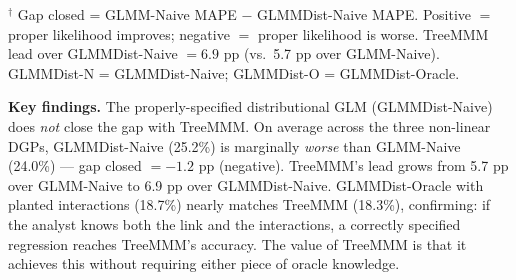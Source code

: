 \documentclass[review,12pt]{elsarticle}
\begin{document}
\begin{table}[ht]
\centering
\small
\caption{Attribution Recovery (share-MAPE) --- properly-specified distributional
         GLM (statsmodels.GLM with Poisson for pharma, Tweedie for CPG, Gamma for
         SaaS, Gaussian for linear; no random effects).
         Single-seed (seed = 42).}
\label{tab:attr2b}
\medskip
\small$^\dagger$ Gap closed = GLMM-Naive MAPE $-$ GLMMDist-Naive MAPE.
Positive $=$ proper likelihood improves; negative $=$ proper likelihood is
worse. TreeMMM lead over GLMMDist-Naive $= 6.9$ pp (vs.\ 5.7 pp over
GLMM-Naive). GLMMDist-N = GLMMDist-Naive; GLMMDist-O = GLMMDist-Oracle.
\end{table}

\textbf{Key findings.} The properly-specified distributional GLM
(GLMMDist-Naive) does \emph{not} close the gap with TreeMMM. On average across
the three non-linear DGPs, GLMMDist-Naive (25.2\%) is marginally
\emph{worse} than GLMM-Naive (24.0\%) --- gap closed $= -1.2$ pp (negative).
TreeMMM's lead grows from 5.7 pp over GLMM-Naive to 6.9 pp over GLMMDist-Naive.
GLMMDist-Oracle with planted interactions (18.7\%) nearly matches TreeMMM
(18.3\%), confirming: if the analyst knows both the link and the interactions, a
correctly specified regression reaches TreeMMM's accuracy. The value of TreeMMM
is that it achieves this without requiring either piece of oracle knowledge.
\end{document}
